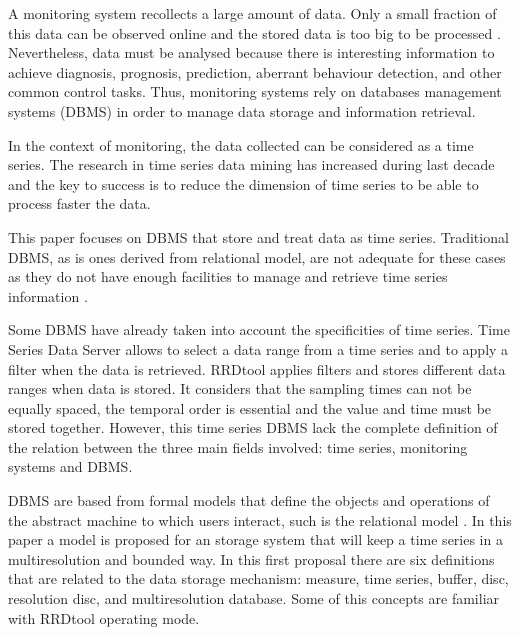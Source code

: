 A monitoring system recollects a large amount of data. Only a small
fraction of this data can be observed online and the stored data is
too big to be processed \parencite{keogh97}. Nevertheless, data must be
analysed because there is interesting information to achieve diagnosis,
prognosis, prediction, aberrant behaviour detection, and other common
control tasks. Thus, monitoring systems rely on databases management systems
(DBMS) in order to manage data storage and information retrieval.


In the context of monitoring, the data collected can be considered as a time
series. The research in time series data mining has
increased during last decade \parencite{fu11} and the key to success is
to reduce the dimension of time series to be able to process faster the
data.

This paper focuses on DBMS that store and treat data as time series.
Traditional DBMS, as is ones derived from relational model, are not adequate for these cases as they do not have enough facilities to manage and retrieve time series information \parencite{schmidt95}. 

Some DBMS have already taken into account the specificities of time
series.  Time Series Data Server \parencite{weigel10} allows to select
a data range from a time series and to apply a filter when the data is
retrieved.  RRDtool \parencite{rrdtool} applies filters and stores
different data ranges when data is stored. It considers that
the sampling times can not be equally spaced, the temporal order is
essential and the value and time must be stored together. However,
this time series DBMS lack the complete definition of the relation
between the three main fields involved: time series, monitoring
systems and DBMS.


DBMS are based from formal models that define
the objects and operations of the abstract machine to which users
interact, such is the relational model \parencite{date}. In this paper
a model is proposed for an storage system that will keep a time series
in a multiresolution and bounded way.  In this first proposal there
are six definitions that are related to the data storage mechanism:
measure, time series, buffer, disc, resolution disc, and multiresolution
database. Some of this concepts are familiar with RRDtool
operating mode.




